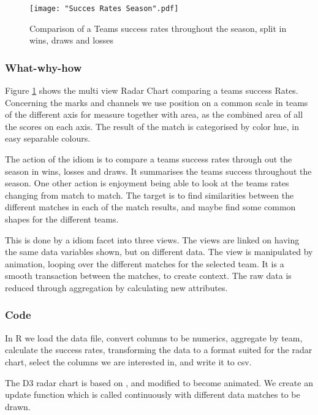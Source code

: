 \documentclass[Report.tex]{subfiles}
\begin{document}
\begin{figure}
\center
\texttt{[image: "Succes Rates Season".pdf]}
\caption{Comparison of a Teams success rates throughout the season, split in wins, draws and losses}
\label{Fig:CC}
\end{figure}


\subsubsection{What-why-how}
Figure \ref{Fig:CC} shows the multi view Radar Chart comparing a teams success Rates. Concerning the marks and channels we use position on a common scale in teams of the different axis for measure together with area, as the combined area of all the scores on each axis. The result of the match is categorised by color hue, in easy separable colours.  

The action of the idiom is to compare a teams success rates through out the season in wins, losses and draws. It summarises the teams success throughout the season. One other action is enjoyment being able to look at the teams rates changing from match to match.
The target is to find similarities between the different matches in each of the match results, and maybe find some common shapes for the different teams.

This is done by a idiom facet into three views. The views are linked on having the same data variables shown, but on different data. The view is manipulated by animation, looping over the different matches for the selected team. It is a smooth transaction between the matches, to create context. The raw data is reduced through aggregation by calculating new attributes.

\subsubsection{Code}
In R we load the data file, convert columns to be numerics, aggregate by team, calculate the success rates, transforming the data to a format suited for the radar chart, select the columns we are interested in, and write it to csv.

The D3 radar chart is based on \cite{RadarChart}, and modified to become animated. We create an update function which is called continuously with different data matches to be drawn. 
\end{document}
